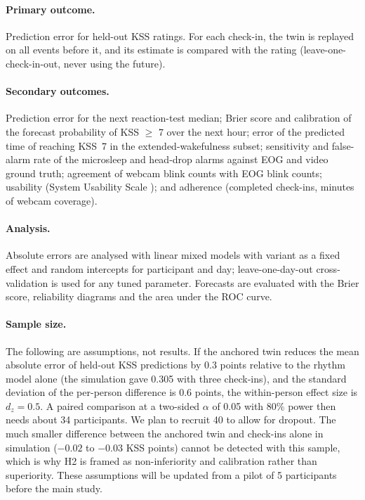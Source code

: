 \paragraph{Primary outcome.} Prediction error for held-out KSS ratings. For each check-in, the twin is replayed on all events before it, and its estimate is compared with the rating (leave-one-check-in-out, never using the future).

\paragraph{Secondary outcomes.} Prediction error for the next reaction-test median; Brier score and calibration of the forecast probability of KSS $\geq$ 7 over the next hour; error of the predicted time of reaching KSS~7 in the extended-wakefulness subset; sensitivity and false-alarm rate of the microsleep and head-drop alarms against EOG and video ground truth; agreement of webcam blink counts with EOG blink counts; usability (System Usability Scale \citep{brooke1996sus}); and adherence (completed check-ins, minutes of webcam coverage).

\paragraph{Analysis.} Absolute errors are analysed with linear mixed models with variant as a fixed effect and random intercepts for participant and day; leave-one-day-out cross-validation is used for any tuned parameter. Forecasts are evaluated with the Brier score, reliability diagrams and the area under the ROC curve.

\paragraph{Sample size.} The following are assumptions, not results. If the anchored twin reduces the mean absolute error of held-out KSS predictions by 0.3 points relative to the rhythm model alone (the simulation gave 0.305 with three check-ins), and the standard deviation of the per-person difference is 0.6 points, the within-person effect size is $d_z = 0.5$. A paired comparison at a two-sided $\alpha$ of 0.05 with 80\% power then needs about 34 participants. We plan to recruit 40 to allow for dropout. The much smaller difference between the anchored twin and check-ins alone in simulation ($-0.02$ to $-0.03$ KSS points) cannot be detected with this sample, which is why H2 is framed as non-inferiority and calibration rather than superiority. These assumptions will be updated from a pilot of 5 participants before the main study.
